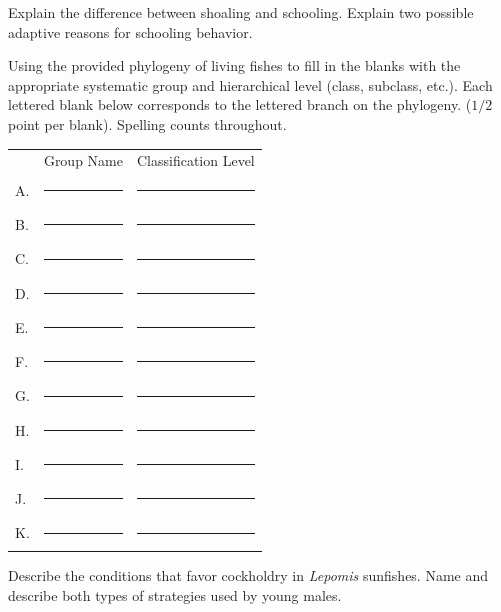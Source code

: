 \question{}
\vspace{0.5\baselineskip}


\question[15]
Explain the difference between shoaling and schooling.  Explain two possible adaptive reasons for schooling behavior.

	\begin{solution}
	\end{solution}


\question[11]
Using the provided phylogeny of living fishes to fill in the blanks with the appropriate systematic group and hierarchical level (class, subclass, etc.).  Each lettered blank below corresponds to the lettered branch on the phylogeny. ($1/2$ point per blank). Spelling counts throughout.\vspace{\baselineskip}

\begin{tabular}{@{}lll@{}}
	&	\multicolumn{1}{c}{Group Name}		& 	\multicolumn{1}{c}{Classification Level} \\[1.5em]
A.	& 	\rule{2.75in}{0.4pt}	&	\rule{2.75in}{0.4pt} \\[1.5em]
B.	& 	\rule{2.75in}{0.4pt}	&	\rule{2.75in}{0.4pt} \\[1.5em]
C.	& 	\rule{2.75in}{0.4pt}	&	\rule{2.75in}{0.4pt} \\[1.5em]
D.	& 	\rule{2.75in}{0.4pt}	&	\rule{2.75in}{0.4pt} \\[1.5em]
E.	& 	\rule{2.75in}{0.4pt}	&	\rule{2.75in}{0.4pt} \\[1.5em]
F.	& 	\rule{2.75in}{0.4pt}	&	\rule{2.75in}{0.4pt} \\[1.5em]
G.	& 	\rule{2.75in}{0.4pt}	&	\rule{2.75in}{0.4pt} \\[1.5em]
H.	& 	\rule{2.75in}{0.4pt}	&	\rule{2.75in}{0.4pt} \\[1.5em]
I.	& 	\rule{2.75in}{0.4pt}	&	\rule{2.75in}{0.4pt} \\[1.5em]
J.	& 	\rule{2.75in}{0.4pt}	&	\rule{2.75in}{0.4pt} \\[1.5em]
K.	& 	\rule{2.75in}{0.4pt}	&	\rule{2.75in}{0.4pt} \\[1.5em]
\end{tabular}

\question[10]
Describe the conditions that favor cockholdry in \textit{Lepomis} sunfishes. Name and describe both types of strategies used by young males.

